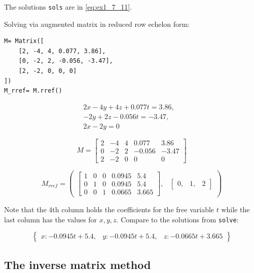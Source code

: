 The solutions \texttt{sols}  are in \ref{eq:ex1_7_11}.

Solving via augmented matrix in reduced row echelon form:

\begin{verbatim}
M= Matrix([
    [2, -4, 4, 0.077, 3.86],
    [0, -2, 2, -0.056, -3.47],
    [2, -2, 0, 0, 0]
])
M_rref= M.rref()
\end{verbatim}

\begin{equation}
\begin{matrix}
2 x - 4 y + 4 z + 0.077 t= 3.86, & \\
- 2 y + 2 z - 0.056 t = -3.47, & \\
2 x - 2 y = 0\end{matrix}
\end{equation}

\begin{equation}
M= \left[\begin{matrix}2 & -4 & 4 & 0.077 & 3.86\\0 & -2 & 2 & -0.056 & -3.47\\2 & -2 & 0 & 0 & 0\end{matrix}\right]
\end{equation}

\begin{equation}
M_{rref} = \begin{pmatrix}\left[\begin{matrix}1 & 0 & 0 & 0.0945 & 5.4\\0 & 1 & 0 & 0.0945 & 5.4\\0 & 0 & 1 & 0.0665 & 3.665\end{matrix}\right], & \begin{bmatrix}0, & 1, & 2\end{bmatrix}\end{pmatrix}
\end{equation}

Note that the 4th column holds the coefficients for the free variable $t$ while the
last column has the values for $x, y, z$. Compare to the solutions
from \sympy \texttt{solve}:

\begin{equation}\label{eq:ex1_7_11}
\begin{Bmatrix}x : - 0.0945 t + 5.4, & y : - 0.0945 t + 5.4, & z : - 0.0665 t + 3.665\end{Bmatrix}
\end{equation}

\subsection{The inverse matrix method}

